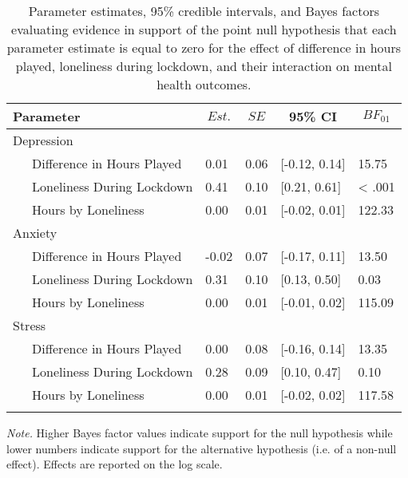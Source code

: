 \documentclass[
  english,
  man,floatsintext]{apa6}
\begin{document}
\begin{table}[!htbp]

\begin{center}
\begin{threeparttable}

\caption{\label{tab:study-three-mh-moderation}Parameter estimates, 95\% credible intervals, and Bayes factors evaluating evidence in support of the point null hypothesis that each parameter estimate is equal to zero for the effect of difference in hours played, loneliness during lockdown, and their interaction on mental health outcomes.}

\begin{tabular}{lllll}
\toprule
Parameter & \multicolumn{1}{c}{$Est.$} & \multicolumn{1}{c}{$SE$} & \multicolumn{1}{c}{95\% CI} & \multicolumn{1}{c}{$BF_{01}$}\\
\midrule
Depression &  &  &  & \\
\ \ \ Difference in Hours Played & 0.01 & 0.06 & {}[-0.12, 0.14] & 15.75\\
\ \ \ Loneliness During Lockdown & 0.41 & 0.10 & {}[0.21, 0.61] & < .001\\
\ \ \ Hours by Loneliness & 0.00 & 0.01 & {}[-0.02, 0.01] & 122.33\\
Anxiety &  &  &  & \\
\ \ \ Difference in Hours Played & -0.02 & 0.07 & {}[-0.17, 0.11] & 13.50\\
\ \ \ Loneliness During Lockdown & 0.31 & 0.10 & {}[0.13, 0.50] & 0.03\\
\ \ \ Hours by Loneliness & 0.00 & 0.01 & {}[-0.01, 0.02] & 115.09\\
Stress &  &  &  & \\
\ \ \ Difference in Hours Played & 0.00 & 0.08 & {}[-0.16, 0.14] & 13.35\\
\ \ \ Loneliness During Lockdown & 0.28 & 0.09 & {}[0.10, 0.47] & 0.10\\
\ \ \ Hours by Loneliness & 0.00 & 0.01 & {}[-0.02, 0.02] & 117.58\\
\bottomrule
\addlinespace
\end{tabular}

\begin{tablenotes}[para]
\normalsize{\textit{Note.} Higher Bayes factor values indicate support for the null hypothesis while lower numbers indicate support for the alternative hypothesis (i.e. of a non-null effect). Effects are reported on the log scale.}
\end{tablenotes}

\end{threeparttable}
\end{center}

\end{table}
\end{document}
